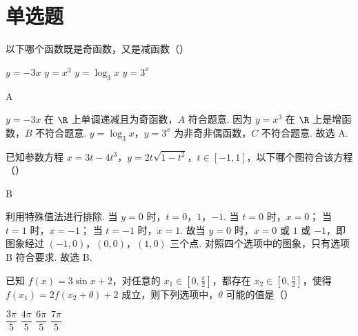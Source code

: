 \section{单选题}

\begin{problem}
以下哪个函数既是奇函数，又是减函数（\quad）

\choices
    {\(y=-3x\)}
    {\(y=x^3\)}
    {\(y=\log_3 x\)}
    {\(y=3^x\)}
\end{problem}

\begin{answer}
A
\end{answer}

\begin{solution}
\(y=-3x\) 在 \(\R\) 上单调递减且为奇函数，\(A\) 符合题意.
因为 \(y=x^3\) 在 \(\R\) 上是增函数，\(B\) 不符合题意.
\(y=\log_3 x\)，\(y=3^x\) 为非奇非偶函数，\(C\) 不符合题意.
故选 A.
\end{solution}

\begin{problem}
已知参数方程 \(x=3t-4t^3\)，\(y=2t\sqrt{1-t^2}\)，\(t\in[-1,1]\)，以下哪个图符合该方程（\quad）

\choices
    {}
    {}
    {}
    {}
\end{problem}

\begin{answer}
B
\end{answer}

\begin{solution}
利用特殊值法进行排除. 当 \(y=0\) 时，\(t=0\)，\(1\)，\(-1\). 当 \(t=0\) 时，\(x=0\)； 当 \(t=1\) 时，\(x=-1\)； 当 \(t=-1\) 时，\(x=1\). 故当 \(y=0\) 时，\(x=0\) 或 \(1\) 或 \(-1\)，即图象经过 \((-1,0)\)，\((0,0)\)，\((1,0)\) 三个点. 对照四个选项中的图象，只有选项 B 符合要求. 故选 B.
\end{solution}

\begin{problem}
已知 \(f(x)=3\sin x+2\)，对任意的 \(x_1\in\left[ 0,\frac{\pi}{2} \right]\)，都存在 \(x_2\in\left[ 0,\frac{\pi}{2} \right]\)，使得 \(f(x_1)=2f(x_2+\theta)+2\) 成立，则下列选项中，\(\theta\) 可能的值是（\quad）

\choices
    {\(\dfrac{3\pi}{5}\)}
    {\(\dfrac{4\pi}{5}\)}
    {\(\dfrac{6\pi}{5}\)}
    {\(\dfrac{7\pi}{5}\)}
\end{problem}

